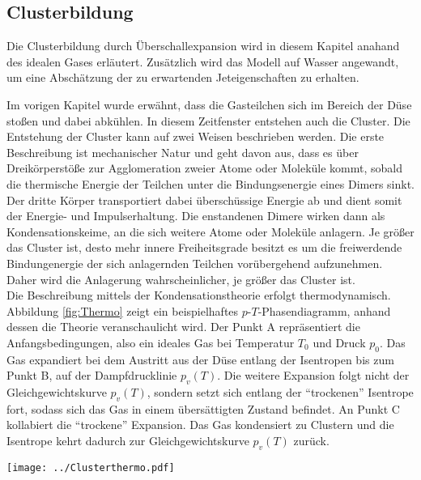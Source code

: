 
\subsection{Clusterbildung} \label{sec:Clusterbildung}

Die Clusterbildung durch Überschallexpansion wird in diesem Kapitel anahand des idealen Gases erläutert. Zusätzlich wird das Modell auf Wasser angewandt, um eine Abschätzung der zu erwartenden Jeteigenschaften zu erhalten.

Im vorigen Kapitel wurde erwähnt, dass die Gasteilchen sich im Bereich der Düse stoßen und dabei abkühlen. In diesem Zeitfenster entstehen auch die Cluster. Die Entstehung der Cluster kann auf zwei Weisen beschrieben werden. Die erste Beschreibung ist mechanischer Natur und geht davon aus, dass es über Dreikörperstöße zur Agglomeration zweier Atome oder Moleküle kommt, sobald die thermische Energie der Teilchen unter die Bindungsenergie eines Dimers sinkt. Der dritte Körper transportiert dabei überschüssige Energie ab und dient somit der Energie- und Impulserhaltung. Die enstandenen Dimere wirken dann als Kondensationskeime, an die sich weitere Atome oder Moleküle anlagern. Je größer das Cluster ist, desto mehr innere Freiheitsgrade besitzt es um die freiwerdende Bindungenergie der sich anlagernden Teilchen vorübergehend aufzunehmen. Daher wird die Anlagerung wahrscheinlicher, je größer das Cluster ist. \cite{dreikcluster05} \\
Die Beschreibung mittels der Kondensationstheorie erfolgt thermodynamisch. 
Abbildung \ref{fig:Thermo} zeigt ein beispielhaftes $p$-$T$-Phasendiagramm, anhand dessen die Theorie veranschaulicht wird. Der Punkt A repräsentiert die Anfangsbedingungen, also ein ideales Gas bei Temperatur $T_0$ und Druck $p_0$. Das Gas expandiert bei dem Austritt aus der Düse entlang der Isentropen bis zum Punkt B, auf der Dampfdrucklinie $p_v(T)$. Die weitere Expansion folgt nicht der Gleichgewichtskurve $p_v(T)$, sondern setzt sich entlang der \enquote{trockenen} Isentrope fort, sodass sich das Gas in einem übersättigten Zustand befindet. An Punkt C kollabiert die \enquote{trockene} Expansion. Das Gas kondensiert zu Clustern und die Isentrope kehrt dadurch zur Gleichgewichtskurve $p_v(T)$ zurück. \cite{hagena1981nucleation}

\begin{center}
\begin{minipage}{\linewidth}
\centering
\texttt{[image: ../Clusterthermo.pdf]}%
 \label{fig:Thermo}
\end{minipage} 
\end{center}

